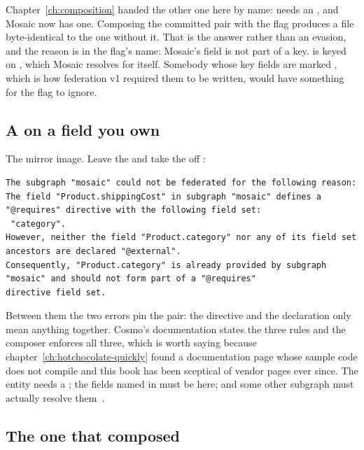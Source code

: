 %
Chapter~\ref{ch:composition} handed the other one here by name:
 needs an , and Mosaic now has
one. Composing the committed pair with the flag produces a file byte-identical
to the one without it. That is the answer rather than an evasion, and the
reason is in the flag's name: Mosaic's  field is not part of a
key.  is keyed on , which Mosaic resolves for itself.
Somebody whose key fields are marked , which is how federation
v1 required them to be written, would have something for the flag to ignore.

\subsection*{A  on a field you own}

The mirror image. Leave the  and take the  off
:

\begin{verbatim}
The subgraph "mosaic" could not be federated for the following reason:
The field "Product.shippingCost" in subgraph "mosaic" defines a "@requires" directive with the following field set:
 "category".
However, neither the field "Product.category" nor any of its field set ancestors are declared "@external".
Consequently, "Product.category" is already provided by subgraph "mosaic" and should not form part of a "@requires"
directive field set.
\end{verbatim}

%
Between them the two errors pin the pair: the directive and the declaration
only mean anything together. Cosmo's documentation states the three rules and
the composer enforces all three, which is worth saying because
chapter~\ref{ch:hotchocolate-quickly} found a documentation page whose sample
code does not compile and this book has been sceptical of vendor pages ever
since. The entity needs a ; the fields named in 
must be  here; and some other subgraph must actually
resolve them~\autocite{cosmo2026requires}.

\subsection*{The one that composed}

